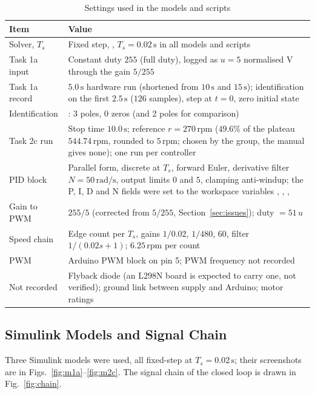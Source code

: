\documentclass[lettersize,journal]{IEEEtran}
\newcommand{\code}[1]{\texttt{\detokenize{#1}}}
\newcommand{\Ts}{T_{\!s}}
\newcommand{\rpm}{\,\text{rpm}}
\begin{document}
\begin{table}[H]
\centering
\caption{Settings used in the models and scripts}
\label{tab:settings}
\begin{tabular}{@{}p{2.3cm}p{5.8cm}@{}}
\toprule
Item & Value \\
\midrule
Solver, $\Ts$ & Fixed step, \code{ode1}, $\Ts=0.02\,\text{s}$ in all models and scripts \\
Task 1a input & Constant duty $255$ (full duty), logged as $u=5$ normalised V through the gain $5/255$ \\
Task 1a record & $5.0\,\text{s}$ hardware run (shortened from $10\,\text{s}$ and $15\,\text{s}$); identification on the first $2.5\,\text{s}$ ($126$ samples), step at $t=0$, zero initial state \\
Identification & \code{tfest}: 3 poles, 0 zeros (and 2 poles for comparison) \\
Task 2c run & Stop time $10.0\,\text{s}$; reference $r=270\rpm$ ($49.6\%$ of the plateau $544.74\rpm$, rounded to $5\rpm$; chosen by the group, the manual gives none); one run per controller \\
PID block & Parallel form, discrete at $\Ts$, forward Euler, derivative filter $N=50\,\text{rad/s}$, output limits $0$ and $5$, clamping anti-windup; the P, I, D and N fields were set to the workspace variables \code{Kp}, \code{Ki}, \code{Kd}, \code{N} \\
Gain to PWM & $255/5$ (corrected from $5/255$, Section~\ref{sec:issues}); duty $=51\,u$ \\
Speed chain & Edge count per $\Ts$, gains $1/0.02$, $1/480$, $60$, filter $1/(0.02s+1)$; $6.25\rpm$ per count \\
PWM & Arduino PWM block on pin 5; PWM frequency not recorded \\
Not recorded & Flyback diode (an L298N board is expected to carry one, not verified); ground link between supply and Arduino; motor ratings \\
\bottomrule
\end{tabular}
\end{table}

\subsection{Simulink Models and Signal Chain}
Three Simulink models were used, all fixed-step at $\Ts=0.02\,\text{s}$; their screenshots are in Figs.~\ref{fig:m1a}--\ref{fig:m2c}. The signal chain of the closed loop is drawn in Fig.~\ref{fig:chain}.
\end{document}
